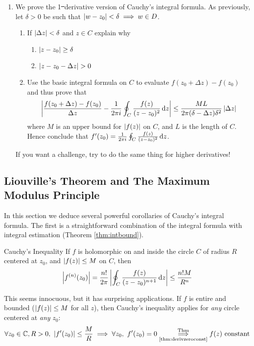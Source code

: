 \begin{exercises}
\begin{enumerate}
	  
		\item\label{exs:cauchyintgeneral} We prove the 1\st\ derivative version of Cauchy's integral formula. As previously, let $\delta>0$ be such that $\left| w-z_0\right|<\delta\implies w\in D$.
		\begin{enumerate}
		  \item If $\left| \Delta z\right|<\delta$ and $z\in C$ explain why
		  \begin{enumerate}
		    \item $\left| z-z_0\right|\ge \delta$
		    \item $\nm{z-z_0-\Delta z}>0$ 
		  \end{enumerate}
		  \item Use the basic integral formula on $C$ to evaluate $f(z_0+\Delta z)-f(z_0)$ and thus prove that
		  \[
		  	\left| \frac{f(z_0+\Delta z)-f(z_0)}{\Delta z}-\frac 1{2\pi i}\oint_C\frac{f(z)}{(z-z_0)^2}\,{\mathrm{d} z}\right| \le \frac{ML}{2\pi(\delta-\Delta z)\delta^2}\left| \Delta z\right|
		  \]
		  where $M$ is an upper bound for $\left| f(z)\right|$ on $C$, and $L$ is the length of $C$. Hence conclude that $f'(z_0)=\frac 1{2\pi i}\oint_C\frac{f(z)}{(z-z_0)^2}\,{\mathrm{d} z}$.
		\end{enumerate}
		If you want a challenge, try to do the same thing for higher derivatives!
		
	\end{enumerate}
\end{exercises}
  
    
\clearpage


\subsection{Liouville's Theorem and The Maximum Modulus Principle}

In this section we deduce several powerful corollaries of Cauchy's integral formula. The first is a straightforward combination of the integral formula with integral estimation (Theorem \ref{thm:intbound}).

\begin{lemm}{Cauchy's Inequality}{}
	If $f$ is holomorphic on and inside the circle $C$ of radius $R$ centered at $z_0$, and $\left| f(z)\right|\le M$ on $C$, then
	\[
		\left| f^{(n)}(z_0)\right|
		=\frac{n!}{2\pi}\left| \oint_{C}\frac{f(z)}{(z-z_0)^{n+1}}\,{\mathrm{d} z}\right|
		\le \frac{n!M}{R^n}
	\]
\end{lemm}

This seems innocuous, but it has surprising applications. If $f$ is entire and bounded ($\left| f(z)\right|\le M$ for all $z$), then Cauchy's inequality applies for \emph{any} circle centered at \emph{any} $z_0$:
\[
	\forall z_0\in\C,R>0,\ \nm{f'(z_0)}\le\frac MR 
	\implies \forall z_0,\ f'(z_0)=0 
	\overset{\text{Thm}}{\underset{\text{\ref{thm:derivzeroconst}}}{\implies}}
	f(z)\text{ constant}
\]

